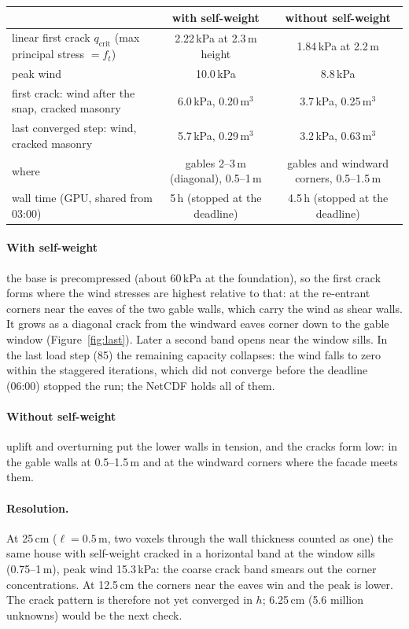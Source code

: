 \documentclass[11pt,a4paper]{article}
\begin{document}
\begin{center}
\small
\begin{tabular}{lcc}
  \toprule
  & with self-weight & without self-weight \\
  \midrule
  linear first crack $q_{\mathrm{crit}}$ (max principal stress $= f_t$) & 2.22\,kPa at 2.3\,m height & 1.84\,kPa at 2.2\,m \\
  peak wind & 10.0\,kPa & 8.8\,kPa \\
  first crack: wind after the snap, cracked masonry & 6.0\,kPa, 0.20\,m$^3$ & 3.7\,kPa, 0.25\,m$^3$ \\
  last converged step: wind, cracked masonry & 5.7\,kPa, 0.29\,m$^3$ & 3.2\,kPa, 0.63\,m$^3$ \\
  where & gables 2--3\,m (diagonal), 0.5--1\,m & gables and windward corners, 0.5--1.5\,m \\
  wall time (GPU, shared from 03:00) & 5\,h (stopped at the deadline) & 4.5\,h (stopped at the deadline) \\
  \bottomrule
\end{tabular}
\end{center}

\paragraph{With self-weight} the base is precompressed (about 60\,kPa at the foundation), so the first crack forms
where the wind stresses are highest relative to that: at the re-entrant corners near the eaves of the two gable walls,
which carry the wind as shear walls. It grows as a diagonal crack from the windward eaves corner down to the gable
window (Figure~\ref{fig:last}). Later a second band opens near the window sills. In the last load step (85) the
remaining capacity collapses: the wind falls to zero within the staggered iterations, which did not converge before
the deadline (06:00) stopped the run; the NetCDF holds all of them.

\paragraph{Without self-weight} uplift and overturning put the lower walls in tension, and the cracks form low: in the
gable walls at 0.5--1.5\,m and at the windward corners where the facade meets them.

\paragraph{Resolution.} At 25\,cm ($\ell = 0.5$\,m, two voxels through the wall thickness counted as one) the same
house with self-weight cracked in a horizontal band at the window sills (0.75--1\,m), peak wind 15.3\,kPa: the coarse
crack band smears out the corner concentrations. At 12.5\,cm the corners near the eaves win and the peak is lower.
The crack pattern is therefore not yet converged in $h$; 6.25\,cm (5.6 million unknowns) would be the next check.
\end{document}
